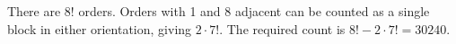 There are $8!$ orders. Orders with 1 and 8 adjacent can be counted as a single block in either orientation, giving $2\cdot7!$. The required count is $8!-2\cdot7!=\boxed{30240}$.
